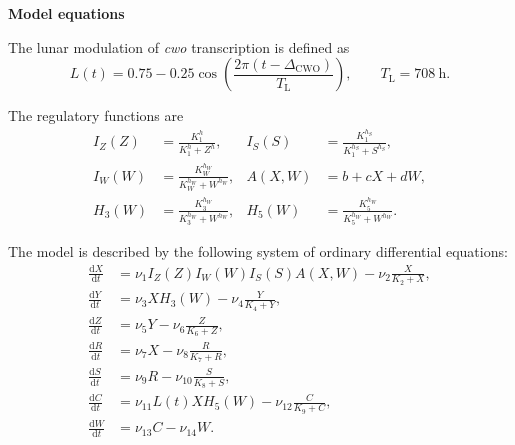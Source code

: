 \documentclass[10pt]{article}
\begin{document}
\begin{center}
{\large\bfseries Model equations}
\end{center}

The lunar modulation of \textit{cwo} transcription is defined as
\begin{equation}
L(t)=0.75-0.25\cos\!\left(
\frac{2\pi\left(t-\Delta_{\mathrm{CWO}}\right)}{T_{\mathrm{L}}}
\right),
\qquad T_{\mathrm{L}}=708\ \mathrm{h}.
\end{equation}

The regulatory functions are
\begin{align}
I_Z(Z) &= \frac{K_1^{h}}{K_1^{h}+Z^{h}}, &
I_S(S) &= \frac{K_1^{h_S}}{K_1^{h_S}+S^{h_S}}, \\
I_W(W) &= \frac{K_W^{h_W}}{K_W^{h_W}+W^{h_W}}, &
A(X,W) &= b+cX+dW, \\
H_3(W) &= \frac{K_3^{h_W}}{K_3^{h_W}+W^{h_W}}, &
H_5(W) &= \frac{K_5^{h_W}}{K_5^{h_W}+W^{h_W}}.
\end{align}

The model is described by the following system of ordinary differential
equations:
\begin{align}
\frac{\mathrm{d}X}{\mathrm{d}t}
&= \nu_1 I_Z(Z)I_W(W)I_S(S)A(X,W)
-\nu_2\frac{X}{K_2+X}, \\
\frac{\mathrm{d}Y}{\mathrm{d}t}
&= \nu_3 XH_3(W)-\nu_4\frac{Y}{K_4+Y}, \\
\frac{\mathrm{d}Z}{\mathrm{d}t}
&= \nu_5Y-\nu_6\frac{Z}{K_6+Z}, \\
\frac{\mathrm{d}R}{\mathrm{d}t}
&= \nu_7X-\nu_8\frac{R}{K_7+R}, \\
\frac{\mathrm{d}S}{\mathrm{d}t}
&= \nu_9R-\nu_{10}\frac{S}{K_8+S}, \\
\frac{\mathrm{d}C}{\mathrm{d}t}
&= \nu_{11}L(t)XH_5(W)-\nu_{12}\frac{C}{K_9+C}, \\
\frac{\mathrm{d}W}{\mathrm{d}t}
&= \nu_{13}C-\nu_{14}W.
\end{align}
\end{document}
